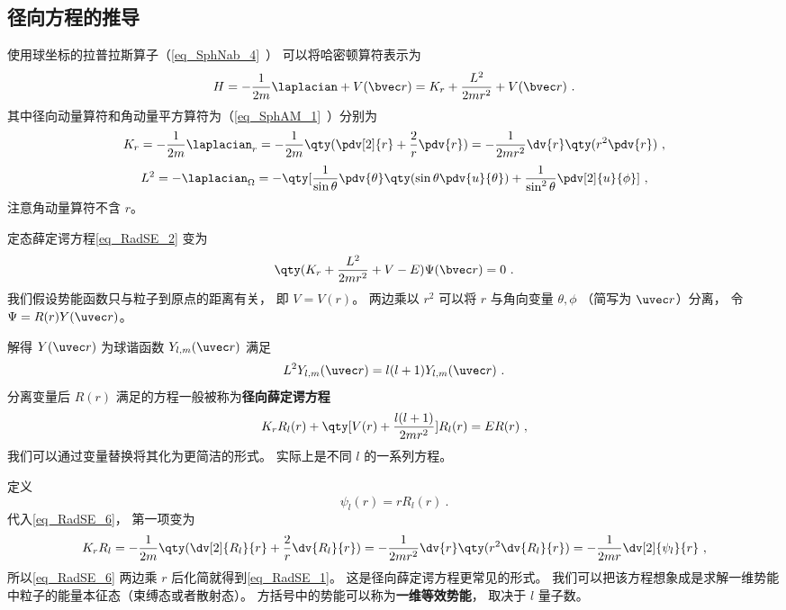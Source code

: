 \subsection{径向方程的推导}
使用球坐标的拉普拉斯算子（\autoref{eq_SphNab_4}~） 可以将哈密顿算符表示为
\begin{equation}
H = -\frac{1}{2m} \laplacian + V(\bvec r) =  K_r + \frac{L^2}{2mr^2} + V(\bvec r)~.
\end{equation}
其中径向动量算符和角动量平方算符为（\autoref{eq_SphAM_1}~）分别为
\begin{equation}
K_r =-\frac{1}{2m} \laplacian_r =  - \frac{1}{2m} \qty(\pdv[2]{r} + \frac2r \pdv{r}) = -\frac{1}{2mr^2} \dv{r} \qty(r^2\pdv{r})~,
\end{equation}
\begin{equation}\label{eq_RadSE_3}
L^2 = -\laplacian_\Omega = -\qty[ \frac{1}{\sin\theta} \pdv{\theta} \qty(\sin \theta \pdv{u}{\theta}) + \frac{1}{\sin^2 \theta} \pdv[2]{u}{\phi}]~,
\end{equation}
注意角动量算符不含 $r$。

定态薛定谔方程\autoref{eq_RadSE_2} 变为
\begin{equation}
\qty(K_r + \frac{L^2}{2mr^2} + V - E)\Psi(\bvec r) = 0~.
\end{equation}
我们假设势能函数只与粒子到原点的距离有关， 即 $V = V(r)$。 两边乘以 $r^2$ 可以将 $r$ 与角向变量 $\theta, \phi$ （简写为 $\uvec r$）分离， 令 $\Psi = R(r)Y(\uvec r)$。

解得 $Y(\uvec r)$ 为球谐函数 $Y_{l,m}(\uvec r)$ 满足
\begin{equation}
L^2 Y_{l,m}(\uvec r) = l(l+1) Y_{l,m}(\uvec r)~.
\end{equation}
分离变量后 $R(r)$ 满足的方程一般被称为\textbf{径向薛定谔方程}
\begin{equation}\label{eq_RadSE_6}
K_r R_l(r) + \qty[V(r) + \frac{l(l+1)}{2mr^2} ]R_l(r) = ER(r)~,
\end{equation}
我们可以通过变量替换将其化为更简洁的形式。 实际上是不同 $l$ 的一系列方程。

定义
\begin{equation}
\psi_l(r) = r R_l(r)~.
\end{equation}
代入\autoref{eq_RadSE_6}， 第一项变为
\begin{equation}
K_r R_l =  - \frac{1}{2m} \qty(\dv[2]{R_l}{r} + \frac2r \dv{R_l}{r}) = -\frac{1}{2mr^2} \dv{r} \qty(r^2\dv{R_l}{r}) =  -\frac{1}{2mr} \dv[2]{\psi_l}{r}~,
\end{equation}
所以\autoref{eq_RadSE_6} 两边乘 $r$ 后化简就得到\autoref{eq_RadSE_1}。 这是径向薛定谔方程更常见的形式。 我们可以把该方程想象成是求解一维势能中粒子的能量本征态（束缚态或者散射态）。 方括号中的势能可以称为\textbf{一维等效势能}， 取决于 $l$ 量子数。

